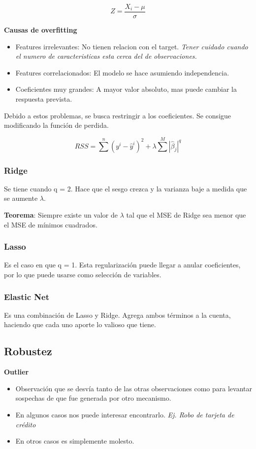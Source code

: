 \documentclass[titlepage,a4paper]{article}
\begin{document}
\begin{equation}
    Z = \frac{X_i - \mu}{\sigma}
\end{equation}

\textbf{Causas de overfitting}
\begin{itemize}
    \item Features irrelevantes: No tienen relacion con el target. \textit{Tener cuidado cuando el numero de caracteristicas esta cerca del de observaciones.}
    \item Features correlacionados: El modelo se hace asumiendo independencia.
    \item Coeficientes muy grandes: A mayor valor absoluto, mas puede cambiar la respuesta prevista.
\end{itemize}

Debido a estos problemas, se busca restringir a los coeficientes. Se consigue modificando la función de perdida.

\begin{equation}
    RSS = \sum^{n} (y^{i}-\hat{y}^{i})^{2} + \lambda \sum^{M} |\hat{\beta}_j|^{q}
\end{equation}

\subsubsection{Ridge}
Se tiene cuando q = 2. Hace que el sesgo crezca y la varianza baje a medida que se aumente $\lambda$.

\textbf{Teorema}: Siempre existe un valor de $\lambda$ tal que el MSE de Ridge sea menor que el MSE de mínimos cuadrados.

\subsubsection{Lasso}
Es el caso en que q = 1. Esta regularización puede llegar a anular coeficientes, por lo que puede usarse como selección de variables.

\subsubsection{Elastic Net}
Es una combinación de Lasso y Ridge. Agrega ambos términos a la cuenta, haciendo que cada uno aporte lo valioso que tiene.

\subsection{Robustez}
\textbf{Outlier}
\begin{itemize}
    \item Observación que se desvía tanto de las otras observaciones como para levantar sospechas de que fue generada por otro mecanismo.
    \item En algunos casos nos puede interesar encontrarlo. \textit{Ej. Robo de tarjeta de crédito}
    \item En otros casos es simplemente molesto.
\end{itemize}
\end{document}
